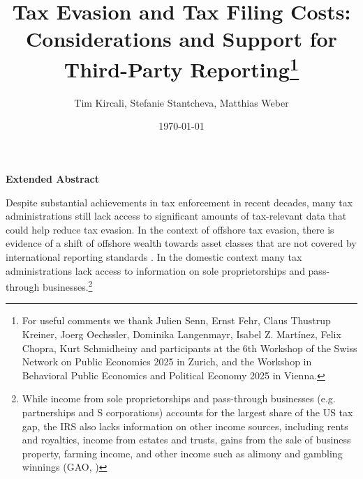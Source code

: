 \documentclass[12pt]{article}
\title{\textbf{\large{Tax Evasion and Tax Filing Costs: \\
Considerations and Support for Third-Party Reporting\footnote{For useful comments we thank Julien Senn, Ernst Fehr, Claus Thustrup Kreiner, Joerg Oechssler, Dominika Langenmayr, Isabel Z. Mart\'{i}nez, Felix Chopra, Kurt Schmidheiny and participants at the 6th Workshop of the Swiss Network on Public Economics 2025 in Zurich, and the Workshop in Behavioral Public Economics and Political Economy 2025 in Vienna.}}}}
\author{\normalsize{Tim Kircali, Stefanie Stantcheva, Matthias Weber}}
\date{\normalsize{\today}}
\begin{document}
\maketitle
{}

\begin{center}
    \textbf{Extended Abstract}
\end{center}
Despite substantial achievements in tax enforcement in recent decades, %
many tax administrations still lack access to significant amounts of tax-relevant data that could help reduce tax evasion. In the context of offshore tax evasion, there is evidence of a shift of offshore wealth towards asset classes that are not covered by international reporting standards \parencite{alstadsaeter2023global,bomare2025avoiding}. In the domestic context many tax administrations lack access to information on sole proprietorships and pass-through businesses.\footnote{While income from sole proprietorships and pass-through businesses (e.g. partnerships and S corporations) accounts for the largest share of the US tax gap, the IRS also lacks information on other income sources, including rents and royalties, income from estates and trusts, gains from the sale of business property, farming income, and other income such as alimony and gambling winnings (GAO, \citeyear{mctigue2019tax})}
\end{document}
